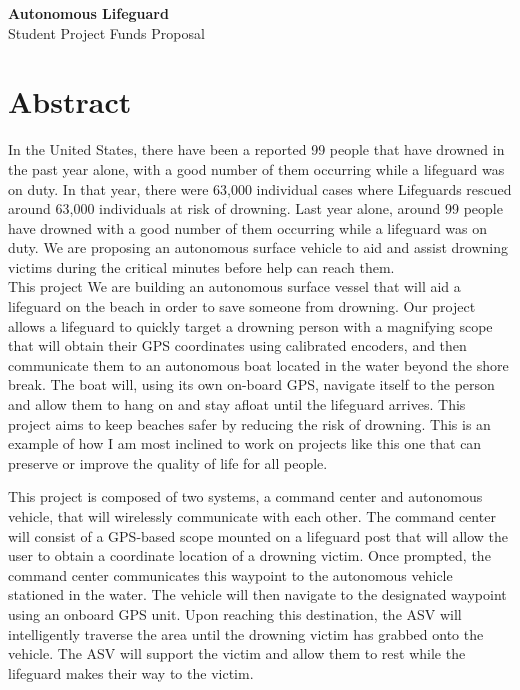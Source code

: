 \documentclass[11pt]{article}
\begin{document}
\begin{center} 
{
    {\Large \textbf{Autonomous Lifeguard}}\\
  	{\large Student Project Funds Proposal}
}
\end{center}

\section*{Abstract}
In the United States, there have been a reported 99 people that have drowned in the past year alone, with a good number of them occurring while a lifeguard was on duty. In that year, there were 63,000 individual cases where Lifeguards rescued around 63,000 individuals at risk of drowning. Last year alone, around 99 people have drowned with a good number of them occurring while a lifeguard was on duty. We are proposing an autonomous surface vehicle to aid and assist drowning victims during the critical minutes before help can reach them.\\


This project We are building an autonomous surface vessel that will aid a lifeguard on the beach in order to save someone from drowning. Our project allows a lifeguard to quickly target a drowning person with a magnifying scope that will obtain their GPS coordinates using calibrated encoders, and then communicate them to an autonomous boat located in the water beyond the shore break. The boat will, using its own on-board GPS, navigate itself to the person and allow them to hang on and stay afloat until the lifeguard arrives. This project aims to keep beaches safer by reducing the risk of drowning. This is an example of how I am most inclined to work on projects like this one that can preserve or improve the quality of life for all people.

This project is composed of two systems, a command center and autonomous vehicle, that will wirelessly communicate with each other. The command center will consist of a GPS-based scope mounted on a lifeguard post that will allow the user to obtain a coordinate location of a drowning victim. Once prompted, the command center communicates this waypoint to the autonomous vehicle stationed in the water. The vehicle will then navigate to the designated waypoint using an onboard GPS unit. Upon reaching this destination, the ASV will intelligently traverse the area until the drowning victim has grabbed onto the vehicle. The ASV will support the victim and allow them to rest while the lifeguard makes their way to the victim.
\end{document}
